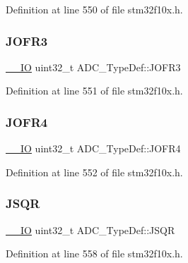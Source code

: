 Definition at line 550 of file stm32f10x.\+h.

\mbox{\label{struct_a_d_c___type_def_ae9c78142f6edf8122384263878d09015}} 
\subsubsection{\texorpdfstring{J\+O\+F\+R3}{JOFR3}}
{\footnotesize\ttfamily \hyperlink{core__sc300_8h_aec43007d9998a0a0e01faede4133d6be}{\+\_\+\+\_\+\+IO} uint32\+\_\+t A\+D\+C\+\_\+\+Type\+Def\+::\+J\+O\+F\+R3}



Definition at line 551 of file stm32f10x.\+h.

\mbox{\label{struct_a_d_c___type_def_a92f5c1a5aaa8b286317f923482e09d35}} 
\subsubsection{\texorpdfstring{J\+O\+F\+R4}{JOFR4}}
{\footnotesize\ttfamily \hyperlink{core__sc300_8h_aec43007d9998a0a0e01faede4133d6be}{\+\_\+\+\_\+\+IO} uint32\+\_\+t A\+D\+C\+\_\+\+Type\+Def\+::\+J\+O\+F\+R4}



Definition at line 552 of file stm32f10x.\+h.

\mbox{\label{struct_a_d_c___type_def_a5438a76a93ac1bd2526e92ef298dc193}} 
\subsubsection{\texorpdfstring{J\+S\+QR}{JSQR}}
{\footnotesize\ttfamily \hyperlink{core__sc300_8h_aec43007d9998a0a0e01faede4133d6be}{\+\_\+\+\_\+\+IO} uint32\+\_\+t A\+D\+C\+\_\+\+Type\+Def\+::\+J\+S\+QR}



Definition at line 558 of file stm32f10x.\+h.

